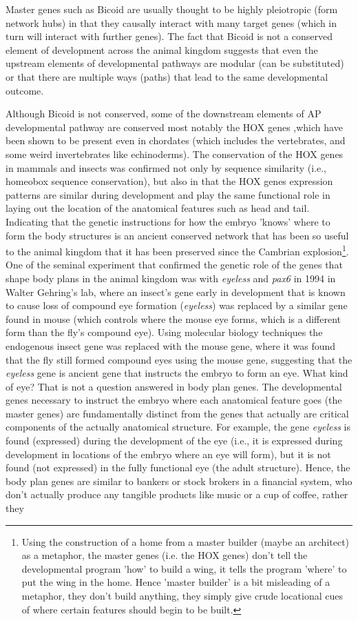 Master genes such as Bicoid are usually thought to be highly pleiotropic (form network hubs) in that they causally interact with many target genes (which in turn will interact with further genes).  The fact that Bicoid is not a conserved element of development across the animal kingdom suggests that even the upstream elements of developmental pathways are modular (can be substituted) or that there are multiple ways (paths) that lead to the same developmental outcome.

Although Bicoid is not conserved, some of the downstream elements of AP developmental pathway are conserved most notably the HOX genes ,which have been shown to be present even in chordates (which includes the vertebrates, and some weird invertebrates like echinoderms).  The conservation of the HOX genes in mammals and insects was confirmed not only by sequence similarity (i.e., homeobox sequence conservation), but also in that the HOX genes expression patterns are similar during development and play the same functional role in laying out the location of the anatomical features such as head and tail.  Indicating that the genetic instructions for how the embryo 'knows' where to form the body structures is an ancient conserved network that has been so useful to the animal kingdom that it has been preserved since the Cambrian explosion\footnote{Using the construction of a home from a master builder (maybe an architect) as a metaphor, the master genes (i.e. the HOX genes) don't tell the developmental program 'how' to build a wing, it tells the program 'where' to put the wing in the home.  Hence 'master builder' is a bit misleading of a metaphor, they don't build anything, they simply give crude locational cues of where certain features should begin to be built.}.  One of the seminal experiment that confirmed the genetic role of the genes that shape body plans in the animal kingdom was with \textit{eyeless} and \textit{pax6} in 1994 in Walter Gehring's lab\cite{pmid7914031}, where an insect's gene early in development that is known to cause loss of compound eye formation (\textit{eyeless}) was replaced by a similar gene found in mouse (which controls where the mouse eye forms, which is a different form than the fly's compound eye).  Using molecular biology techniques the endogenous insect gene was replaced with the mouse gene, where it was found that the fly still formed compound eyes using the mouse gene, suggesting that the \textit{eyeless} gene is ancient gene that instructs the embryo to form an eye.  What kind of eye?  That is not a question answered in body plan genes.  The developmental genes necessary to instruct the embryo where each anatomical feature goes (the master genes) are fundamentally distinct from the genes that actually are critical components of the actually anatomical structure.  For example, the gene \textit{eyeless} is found (expressed) during the development of the eye (i.e., it is expressed during development in locations of the embryo where an eye will form), but it is not found (not expressed) in the fully functional eye (the adult structure).  Hence, the body plan genes are similar to bankers or stock brokers in a financial system, who don't actually produce any tangible products like music or a cup of coffee, rather they 
